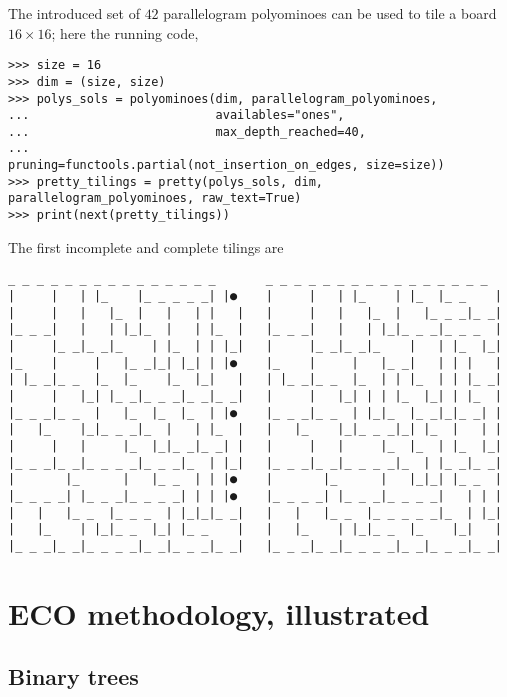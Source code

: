 \begin{example}
The introduced set of $42$ parallelogram polyominoes can be used to tile a
board $16\times 16$; here the running code,
\begin{verbatim}
>>> size = 16
>>> dim = (size, size)
>>> polys_sols = polyominoes(dim, parallelogram_polyominoes,
...                          availables="ones",
...                          max_depth_reached=40,
...                          pruning=functools.partial(not_insertion_on_edges, size=size))
>>> pretty_tilings = pretty(polys_sols, dim, parallelogram_polyominoes, raw_text=True)
>>> print(next(pretty_tilings))
\end{verbatim}
\newpage
The first incomplete and complete tilings are
\begin{Verbatim}[baselinestretch=0.1, fontsize=\small]
 _ _ _ _ _ _ _ _ _ _ _ _ _ _ _       _ _ _ _ _ _ _ _ _ _ _ _ _ _ _ _
|     |   | |_    |_ _ _ _ _| |●    |     |   | |_    | |_  |_ _    |
|     |   |   |_  |   |   | |   |   |     |   |   |_  |   |_ _ _|_ _|
|_ _ _|   |   | |_|_  |   | |_  |   |_ _ _|   |   | |_|_ _ _|_ _ _  |
|     |_ _|_ _|_    | |_  | | |_|   |     |_ _|_ _|_    |   | |_  |_|
|_    |     |   |_ _|_| |_| | |●    |_    |     |   |_ _|   | | |   |
| |_ _|_ _  |_  |_    |_  |_|   |   | |_ _|_ _  |_  | | |_  | | |_ _|
|     |   |_| |_ _|_ _ _|_ _|_ _|   |     |   |_| | | |_  |_| | |_  |
|_ _ _|_ _  |   |_  |_  |_  | |●    |_ _ _|_ _  | |_|_  |_ _|_|_ _| |
|   |_    |_|_ _ _|_  |   | |_  |   |   |_    |_|_ _ _|_| |_  |   | |
|     |   |     |_  |_|_ _|_ _| |   |     |   |     |_  |_  | |_  |_|
|_ _ _|_ _|_ _ _ _|_ _ _|_  | |_|   |_ _ _|_ _|_ _ _ _|_  | |_ _|_ _|
|       |_      |   |_ _  | | |●    |       |_      |   |_|_| |_ _  |
|_ _ _ _| |_ _ _|_ _ _ _| | | |●    |_ _ _ _| |_ _ _|_ _ _ _|   | | |
|   |   |_ _  |_ _ _  | |_|_|_ _|   |   |   |_ _  |_ _ _ _ _|_  | |_|
|   |_    | |_|_ _  |_| |_ _    |   |   |_    | |_|_ _  |_    |_|   |
|_ _ _|_ _|_ _ _ _|_ _|_ _ _|_ _|   |_ _ _|_ _|_ _ _ _|_ _|_ _ _|_ _|
\end{Verbatim}
\end{example}

\section{ECO methodology, illustrated}

\newpage
\subsection{Binary trees}


